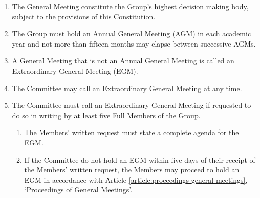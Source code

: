 \documentclass[12pt]{constitution}
\begin{document}

\label{article:general-meetings}

\begin{enumerate}
    \item The General Meeting constitute the Group's highest decision ­making body, subject to the provisions of this Constitution.
    \item The Group must hold an Annual General Meeting (AGM) in each academic year and not more than fifteen months may elapse between successive AGMs.
    \item A General Meeting that is not an Annual General Meeting is called an Extraordinary General Meeting (EGM).
    \item The Committee may call an Extraordinary General Meeting at any time.
    \item The Committee must call an Extraordinary General Meeting if requested to do so in writing by at least five Full Members of the Group.
    \begin{enumerate}
        \item The Members' written request must state a complete agenda for the EGM.
        \item If the Committee do not hold an EGM within five days of their receipt of the Members' written request, the Members may proceed to hold an EGM in accordance with Article \ref{article:proceedings-general-meetings}, `Proceedings of General Meetings'.
    \end{enumerate}
\end{enumerate}


\label{article:proceedings-general-meetings}
\end{document}
